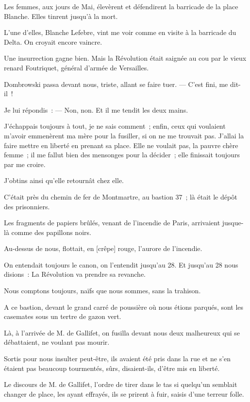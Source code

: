 \documentclass[french,twoside]{book} %
\newcommand\corr[1]{#1}
\begin{document}
Les femmes, aux jours de Mai, élevèrent et défendirent la barricade de la place Blanche. Elles tinrent jusqu’à la mort.\par
L’une d’elles, Blanche Lefebre, vint me voir comme en visite à la barricade du Delta. On croyait encore vaincre.\par
Une insurrection gagne bien. Mais la Révolution était saignée au cou par le vieux renard Foutriquet, général d’armée de Versailles.\par
Dombrowski passa devant nous, triste, allant se faire tuer. — C’est fini, me dit-il !\par
Je lui répondis : — Non, non. Et il me tendit les deux mains.\par
J’échappais toujours à tout, je ne sais comment ; enfin, ceux qui voulaient m’avoir emmenèrent ma mère pour la fusiller, si on ne me trouvait pas. J’allai la faire mettre en liberté en prenant sa place. Elle ne voulait pas, la pauvre  chère femme ; il me fallut bien des mensonges pour la décider ; elle finissait toujours par me croire.\par
J’obtins ainsi qu’elle retournât chez elle.\par
C’était près du chemin de fer de Montmartre, au bastion 37 ; là était le dépôt des prisonniers.\par
Les fragments de papiers brûlés, venant de l’incendie de Paris, arrivaient jusque-là comme des papillons noirs.\par
Au-dessus de nous, flottait, en [{\corr crêpe}] rouge, l’aurore de l’incendie.\par
On entendait toujours le canon, on l’entendit jusqu’au 28. Et jusqu’au 28 nous disions : La Révolution va prendre sa revanche.\par
Nous comptons toujours, naïfs que nous sommes, sans la trahison.\par
A ce bastion, devant le grand carré de poussière où nous étions parqués, sont les casemates sous un tertre de gazon vert.\par
Là, à l’arrivée de M. de Gallifet, on fusilla devant nous deux malheureux qui se débattaient, ne voulant pas mourir.\par
Sortis pour nous insulter peut-être, ils avaient été pris dans la rue et ne s’en étaient pas beaucoup tourmentés, sûrs, disaient-ils, d’être mis en liberté.\par
Le discours de M. de Gallifet, l’ordre de tirer  dans le tas si quelqu’un semblait changer de place, les ayant effrayés, ils se prirent à fuir, saisis d’une terreur folle.\par
\end{document}
